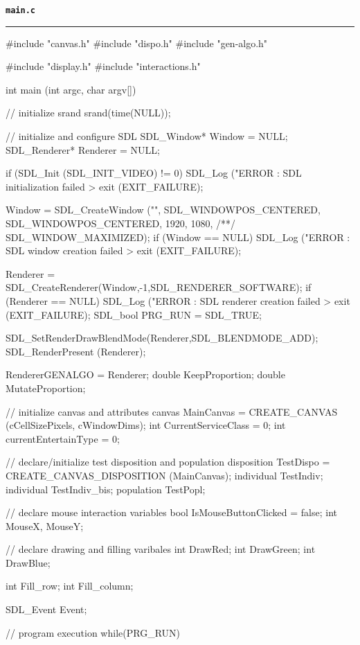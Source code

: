 \vspace*{5mm}
{\Large \texttt{\textbf{main.c}}}
\vspace*{1mm}
\hrule
\begin{C}
#include "canvas.h"
#include "dispo.h"
#include "gen-algo.h"

#include "display.h"
#include "interactions.h"

int main (int argc, char argv[]){
	
	// initialize srand
	srand(time(NULL));
	
	// initialize and configure SDL
	SDL_Window* Window = NULL;
	SDL_Renderer* Renderer = NULL;
	
	if (SDL_Init (SDL_INIT_VIDEO) != 0){
		SDL_Log ("ERROR : SDL initialization failed > %
		exit (EXIT_FAILURE);
	}
	
	Window = SDL_CreateWindow ("", SDL_WINDOWPOS_CENTERED, SDL_WINDOWPOS_CENTERED, 1920, 1080,
	/**/ SDL_WINDOW_MAXIMIZED);
	if (Window == NULL){
		SDL_Log ("ERROR : SDL window creation failed > %
		exit (EXIT_FAILURE);
	}
	
	Renderer = SDL_CreateRenderer(Window,-1,SDL_RENDERER_SOFTWARE);
	if (Renderer == NULL) {
		SDL_Log ("ERROR : SDL renderer creation failed > %
		exit (EXIT_FAILURE);
	}
	SDL_bool PRG_RUN = SDL_TRUE;
	
	SDL_SetRenderDrawBlendMode(Renderer,SDL_BLENDMODE_ADD);
	SDL_RenderPresent (Renderer);
	
	
	
	RendererGENALGO = Renderer;
	double KeepProportion;
	double MutateProportion;
	
	
	// initialize canvas and attributes
	canvas MainCanvas = CREATE_CANVAS (cCellSizePixels, cWindowDims);
	int CurrentServiceClass = 0;
	int currentEntertainType = 0;
	
	// declare/initialize test disposition and population
	disposition TestDispo = CREATE_CANVAS_DISPOSITION (MainCanvas);
	individual TestIndiv;
	individual TestIndiv_bis;
	population TestPopl;
	
	// declare mouse interaction variables
	bool IsMouseButtonClicked = false;
	int MouseX, MouseY;
	
	// declare drawing and filling varibales
	int DrawRed;
	int DrawGreen;
	int DrawBlue;
	
	int Fill_row;
	int Fill_column;
	
	
	
	SDL_Event Event;
	
	// program execution
	while(PRG_RUN){
		
}}
\end{C}
